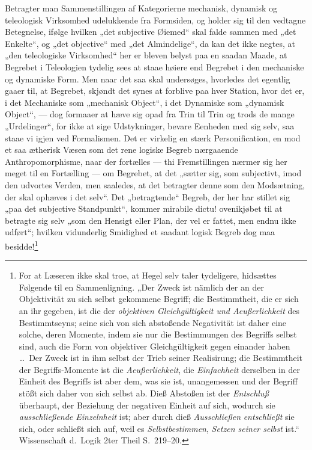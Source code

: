 \documentclass[12pt]{book}
\newcommand{\opage}[1]{\marginnote{\footnotesize\textit{[#1]}}}
\begin{document}
Betragter man Sammenstillingen af Kategorierne mechanisk, dynamisk og teleologisk Virksomhed
udelukkende fra Formsiden, og holder sig til den vedtagne Betegnelse, ifølge hvilken „det
subjective Øiemed“ skal falde sammen med „det Enkelte“, og „det objective“ med „det Almindelige“,
da kan det ikke negtes, at „den teleologiske Virksomhed“ her er bleven belyst paa en saadan Maade,
at Begrebet i Teleologien tydelig sees at staae høiere end Begrebet i den mechaniske og dynamiske
Form. Men naar det saa skal undersøges, hvorledes det egentlig gaaer til, at Begrebet, skjøndt det
synes at forblive paa hver Station, hvor det er, i det Mechaniske som „mechanisk Object“, i det
Dynamiske som „dynamisk Object“, --- dog formaaer at hæve sig opad fra Trin til Trin og trods de
mange „Urdelinger“, for ikke at sige Udstykninger, bevare Eenheden med sig selv, saa staae vi igjen
ved Formalismen.
\opage{226} Det er virkelig en stærk Personification, en mod et saa ætherisk Væsen som det rene logiske Begreb
nærgaaende Anthropomorphisme, naar der fortælles --- thi Fremstillingen nærmer sig her meget til en
Fortælling --- om Begrebet, at det „sætter sig, som subjectivt, imod den udvortes Verden, men
saaledes, at det betragter denne som den Modsætning, der skal ophæves i det selv“. Det
„betragtende“ Begreb, der her har stillet sig „paa det subjective Standpunkt“, kommer mirabile
dictu! ovenikjøbet til at betragte sig selv „som den Hensigt eller Plan, der vel er fattet, men
endnu ikke udført“; hvilken vidunderlig Smidighed et saadant logisk Begreb dog maa
besidde!\footnote{For at Læseren ikke skal troe, at Hegel selv taler tydeligere, hidsættes Følgende
til en Sammenligning. „Der Zweck ist nämlich der an der Objektivität zu sich selbst gekommene
Begriff; die Bestimmtheit, die er sich an ihr gegeben, ist die der \emph{objektiven Gleichgültigkeit
und Aeußerlichkeit} des Bestimmtseyns; seine sich von sich abstoßende Negativität ist daher eine
solche, deren Momente, indem sie nur die Bestimmungen des Begriffs selbst sind, auch die Form von
objektiver Gleichgültigkeit gegen einander haben \dots\ Der Zweck ist in ihm selbst der Trieb
seiner Realisirung; die Bestimmtheit der Begriffs-Momente ist die \emph{Aeußerlichkeit}, die
\emph{Einfachheit} derselben in der Einheit des Begriffs ist aber dem, was sie ist, unangemessen und
der Begriff stößt sich daher von sich selbst ab. Dieß Abstoßen ist der \emph{Entschluß} überhaupt,
der Beziehung der negativen Einheit auf sich, wodurch sie \emph{ausschließende Einzelnheit} ist;
aber durch dieß \emph{Ausschließen} \emph{entschließt} sie sich, oder schließt sich auf, weil es
\emph{Selbstbestimmen}, \emph{Setzen seiner selbst} ist.“ Wissenschaft d.\ Logik 2ter Theil
S.~219--20.}
\end{document}
